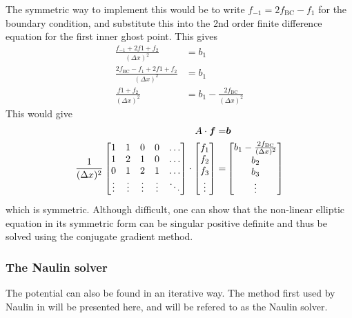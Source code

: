 The symmetric way to implement this would be to write
$f_{-1}=2f_{\text{BC}}-f_{1}$ for the boundary condition, and substitute this
into the 2nd order finite difference equation for the first inner ghost point.
This gives
%
\begin{align*}
    \frac{f_{-1}+2f{1}+f_{2}}{(\Delta x)^2}&=b_1\\
    \frac{2f_{\text{BC}}-f_{1}+2f{1}+f_{2}}{(\Delta x)^2}&=b_1\\
    \frac{f{1}+f_{2}}{(\Delta x)^2}&=b_1 - \frac{2f_{\text{BC}}}{(\Delta x)^2}
\end{align*}
%
This would give
%
\begin{align*}
    A\cdot\boldsymbol{f}=&\boldsymbol{b}\\
    \frac{1}{(\Delta x)^2}
    \begin{bmatrix}
        1                       & 1                       & 0 & 0 & \ldots\\
        1                       & 2                       & 1 & 0 & \ldots\\
        0                       & 1                       & 2 & 1 & \ldots\\
        \vdots                  & \vdots              &\vdots&\vdots&\ddots\\
    \end{bmatrix}
    \cdot
    \begin{bmatrix}
        f_{1}\\
        f_{2}\\
        f_{3}\\
        \vdots
    \end{bmatrix}
    =&
    \begin{bmatrix}
        b_{1} - \frac{2f_{\text{BC}}}{(\Delta x)^2}\\
        b_{2}\\
        b_{3}\\
        \vdots
    \end{bmatrix}
\end{align*}
%
which is symmetric. Although difficult, one can show that the non-linear
elliptic equation in its symmetric form can be singular positive definite and
thus be solved using the conjugate gradient method.

\subsubsection{The Naulin solver}
%
The potential can also be found in an iterative way. The method first used by
Naulin in \cite{Naulin2008} will be presented here, and will be refered to as
the Naulin solver.


